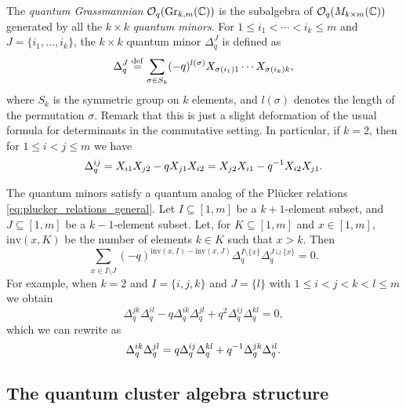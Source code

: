 The \emph{quantum Grassmannian}
$\mathcal{O}_q(\operatorname{Gr}_{k,m}(\mathbb{C}))$ is the subalgebra of
$\mathcal{O}_q(M_{k\times m}(\mathbb{C}))$ generated by all the $k \times k$ \emph{quantum
	minors}. For $1 \leq i_1 < \dotsb < i_k \leq
	m$ and $J = \{i_1, \dotsc, i_k\}$, the $k \times k$ quantum minor
$\Delta^J_q$ is defined as
\begin{equation*}
	\Delta^J_q \overset{\mathrm{def}}{=} \sum_{\sigma \in S_k} (-q)^{l(\sigma)}X_{\sigma(i_1)1}\cdots X_{\sigma(i_k)k},
\end{equation*}
%
where $S_k$ is the symmetric group on $k$ elements, and $l(\sigma)$ denotes the length
of the permutation $\sigma$. Remark that this is just a slight deformation of the usual
formula for determinants in the commutative setting. In particular, if $k = 2$, then
for $1 \leq i < j \leq m$ we have
\begin{equation*}
	\Delta_q^{ij} = X_{i1}X_{j2} - q X_{j1}X_{i2} = X_{j2}X_{i1} - q^{-1} X_{i2}X_{j1}.
\end{equation*}

The quantum minors satisfy a quantum analog of the Plücker relations
\cref{eq:plucker_relations_general}. Let $I \subseteq [1, m]$ be a $k+1$-element
subset, and $J \subseteq [1, m]$ be a $k-1$-element subset. Let, for $K \subseteq [1,
		m]$ and $x \in [1, m]$, $\text{inv}(x, K)$ be the number of elements $k \in K$ such
that $x > k$. Then
\begin{equation}\label{eq:quantum_plucker}
	\sum_{x \in I \setminus J} (-q)^{\text{inv}(x, I) - \text{inv}(x, J)} \Delta_q^{I\setminus \{x\}} \Delta_q^{J \sqcup \{x\}} = 0.
\end{equation}
%
For example, when $k=2$ and $I = \{i,j,k\}$ and $J = \{l\}$ with $1 \leq i < j < k < l
	\leq m$ we obtain
\begin{equation*}
	\Delta_q^{jk}\Delta_q^{il} -q \Delta_q^{ik}\Delta_q^{jl} + q^2 \Delta_q^{ij}\Delta_q^{kl} = 0,
\end{equation*}
%
which we can rewrite as
\begin{equation}\label{eq:quantum_plucker_special_case}
	\Delta_q^{ik}\Delta_q^{jl} = q \Delta_q^{ij}\Delta_q^{kl} + q^{-1} \Delta_q^{jk}\Delta_q^{il}.
\end{equation}

\subsection{The quantum cluster algebra structure}

